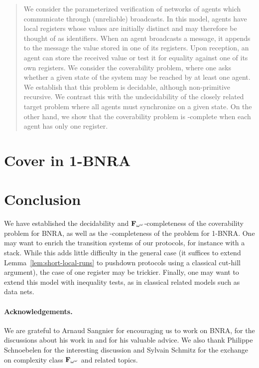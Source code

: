 \documentclass[runningheads]{llncs}
\begin{document}
	\begin{abstract}
	We consider the parameterized verification of networks of agents which communicate through (unreliable) broadcasts. In this model, agents have local registers whose values are initially distinct and may therefore be thought of as identifiers.
	When an agent broadcasts a message, it appends to the message the value stored in one of its registers. Upon reception, an agent can store the received value or test it for equality against one of its own registers. 
	We consider the coverability problem, where one asks whether a given state of the system may be reached by at least one agent. We establish that this problem is decidable, although non-primitive recursive. We contrast this with the undecidability of the closely related target problem where all agents must synchronize on a given state. 
	On the other hand, we show that the coverability problem is \NP-complete when each agent has only one register.
	
	 
	\end{abstract}


	
%
	
	
	
	\section{Cover in 1-BNRA}
	\label{sec:cover-1BNRA}
	
	
%	
%
	\section{Conclusion}
	We have established the decidability and $\mathbf{F}_{\omega^\omega}$-completeness of the coverability problem for BNRA, as well as the \NP-completeness of the problem for 1-BNRA.
	One may want to enrich the transition systems of our protocols, for instance with a stack. While this adds little difficulty in the general case (it suffices to extend Lemma~\ref{lem:short-local-runs} to pushdown protocols using a classical cut-hill argument), the case of one register may be trickier.
	Finally, one may want to extend this model with inequality tests, as in classical related models such as data nets.
	
	\paragraph*{Acknowledgements.} We are grateful to Arnaud Sangnier for encouraging us to work on BNRA, for the discussions about his work in \cite{DelzannoST13} and for his valuable advice. We also thank Philippe Schnoebelen for the interesting discussion and Sylvain Schmitz for the exchange on complexity class $\mathbf{F}_{\omega^{\omega}}$ and related topics.   
	
	
\end{document}
